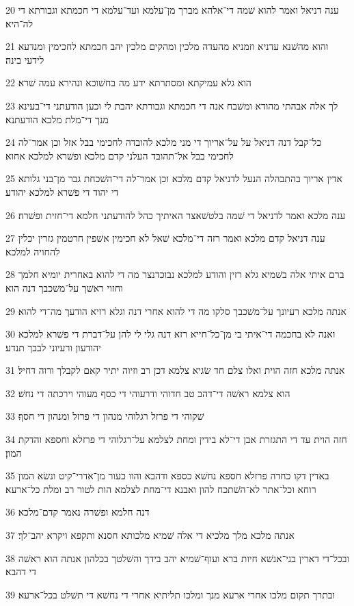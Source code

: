 \par 20 ענה דניאל ואמר להוא שׁמה די־אלהא מברך מן־עלמא ועד־עלמא די חכמתא וגבורתא די לה־היא׃
\par 21 והוא מהשׁנא עדניא וזמניא מהעדה מלכין ומהקים מלכין יהב חכמתא לחכימין ומנדעא לידעי בינה׃
\par 22 הוא גלא עמיקתא ומסתרתא ידע מה בחשׁוכא ונהירא עמה שׁרא׃
\par 23 לך אלה אבהתי מהודא ומשׁבח אנה די חכמתא וגבורתא יהבת לי וכען הודעתני די־בעינא מנך די־מלת מלכא הודעתנא׃
\par 24 כל־קבל דנה דניאל על על־אריוך די מני מלכא להובדה לחכימי בבל אזל וכן אמר־לה לחכימי בבל אל־תהובד העלני קדם מלכא ופשׁרא למלכא אחוא׃
\par 25 אדין אריוך בהתבהלה הנעל לדניאל קדם מלכא וכן אמר־לה די־השׁכחת גבר מן־בני גלותא די יהוד די פשׁרא למלכא יהודע׃
\par 26 ענה מלכא ואמר לדניאל די שׁמה בלטשׁאצר האיתיך כהל להודעתני חלמא די־חזית ופשׁרה׃
\par 27 ענה דניאל קדם מלכא ואמר רזה די־מלכא שׁאל לא חכימין אשׁפין חרטמין גזרין יכלין להחויה למלכא׃
\par 28 ברם איתי אלה בשׁמיא גלא רזין והודע למלכא נבוכדנצר מה די להוא באחרית יומיא חלמך וחזוי ראשׁך על־משׁכבך דנה הוא׃
\par 29 אנתה מלכא רעיונך על־משׁכבך סלקו מה די להוא אחרי דנה וגלא רזיא הודעך מה־די להוא׃
\par 30 ואנה לא בחכמה די־איתי בי מן־כל־חייא רזא דנה גלי לי להן על־דברת די פשׁרא למלכא יהודעון ורעיוני לבבך תנדע׃
\par 31 אנתה מלכא חזה הוית ואלו צלם חד שׂגיא צלמא דכן רב וזיוה יתיר קאם לקבלך ורוה דחיל׃
\par 32 הוא צלמא ראשׁה די־דהב טב חדוהי ודרעוהי די כסף מעוהי וירכתה די נחשׁ׃
\par 33 שׁקוהי די פרזל רגלוהי מנהון די פרזל ומנהון די חסף׃
\par 34 חזה הוית עד די התגזרת אבן די־לא בידין ומחת לצלמא על־רגלוהי די פרזלא וחספא והדקת המון׃
\par 35 באדין דקו כחדה פרזלא חספא נחשׁא כספא ודהבא והוו כעור מן־אדרי־קיט ונשׂא המון רוחא וכל־אתר לא־השׁתכח להון ואבנא די־מחת לצלמא הות לטור רב ומלת כל־ארעא׃
\par 36 דנה חלמא ופשׁרה נאמר קדם־מלכא׃
\par 37 אנתה מלכא מלך מלכיא די אלה שׁמיא מלכותא חסנא ותקפא ויקרא יהב־לך׃
\par 38 ובכל־די דארין בני־אנשׁא חיות ברא ועוף־שׁמיא יהב בידך והשׁלטך בכלהון אנתה הוא ראשׁה די דהבא׃
\par 39 ובתרך תקום מלכו אחרי ארעא מנך ומלכו תליתיא אחרי די נחשׁא די תשׁלט בכל־ארעא׃
